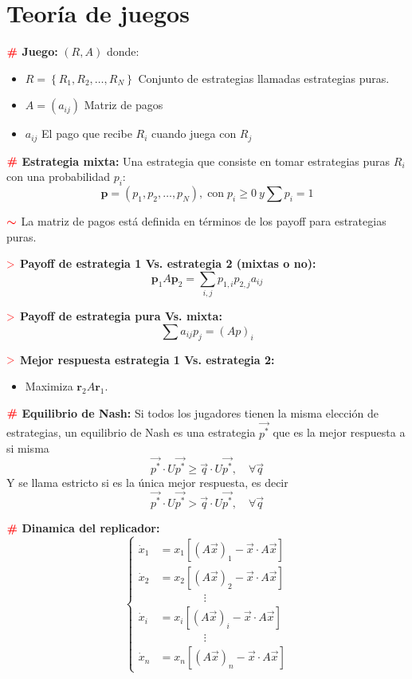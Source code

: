 \documentclass[%
 reprint,
 amsmath,amssymb,
 aps,
]{revtex4-1}
\newcommand{\propiedad}{\textcolor{red}{\mathbf{>}}}
\newcommand{\definir}{\color{red}{\textbf{\#}}}
\newcommand{\nota}{\textcolor{red}{\color{red}{\boldsymbol{\sim}}}}
\begin{document}
\section{Teoría de juegos}

$\definir$ \textbf{Juego:} 
$(R, A)$ donde:
\begin{itemize}
  \item[] 
  $R=\left\{R_{1}, R_{2}, \ldots, R_{N}\right\}$ Conjunto de estrategias llamadas estrategias puras. 
  \item[] 
  $A=\left(a_{i j}\right)$ Matriz de pagos
  \item[] 
  $a_{i j}$ El pago que recibe $R_i$ cuando juega con $R_j$
\end{itemize}

$\definir$ \textbf{Estrategia mixta:} 
Una estrategia que consiste en tomar estrategias puras $R_i$ con una probabilidad $p_i$:
$$
\boldsymbol{p}=\left(p_{1}, p_{2}, \ldots, p_{N}\right), \operatorname{con} p_{i} \geq 0 \ y \sum p_{i}=1
$$

$\nota$ La matriz de pagos está definida en términos de los payoff para estrategias puras. 

$\propiedad$ \textbf{Payoff de estrategia 1 Vs. estrategia 2 (mixtas o no):}
$$
\mathbf{p}_{1} A \mathbf{p}_{2} = \sum_{i, j} p_{1,i} p_{2,j} a_{i j}
$$

$\propiedad$ \textbf{Payoff de estrategia pura Vs. mixta:}
$$
\sum a_{i j} p_{j}=(A p)_{i}
$$

$\propiedad$ \textbf{Mejor respuesta estrategia 1 Vs. estrategia 2:} 
\begin{itemize}
  \item[] Maximiza  $\mathbf{r}_{2} A \mathbf{r}_1$. 
\end{itemize}

$\definir$ \textbf{Equilibrio de Nash:} 
Si todos los jugadores tienen la misma elección de estrategias, un equilibrio de Nash es una estrategia $\vec{p^{*}}$ que es la mejor respuesta a si misma
$$
\vec{p^{*}} \cdot U \vec{p^{*}} \geqslant \vec{q} \cdot U \vec{p^{*}}, \quad \forall \vec{q}
$$
Y se llama estricto si es la única mejor respuesta, es decir
$$
\vec{p^{*}} \cdot U \vec{p^{*}} > \vec{q} \cdot U \vec{p^{*}}, \quad \forall \vec{q}
$$

$\definir$ \textbf{Dinamica del replicador:}
$$ 
\left\lbrace
\begin{aligned}
  \dot{x}_{1} &= x_{1}\left[(A \vec{x})_{1}-\vec{x} \cdot A \vec{x}\right] \\
  \dot{x}_{2} &= x_{2}\left[(A \vec{x})_{2}-\vec{x} \cdot A \vec{x}\right] \\
  \ & \qquad \qquad \vdots \\ 
  \dot{x}_{i} &= x_{i}\left[(A \vec{x})_{i}-\vec{x} \cdot A \vec{x}\right] \\
  \ & \qquad \qquad \vdots \\ 
  \dot{x}_{n} &= x_{n}\left[(A \vec{x})_{n}-\vec{x} \cdot A \vec{x}\right]
\end{aligned}
\right.
$$
\end{document}
